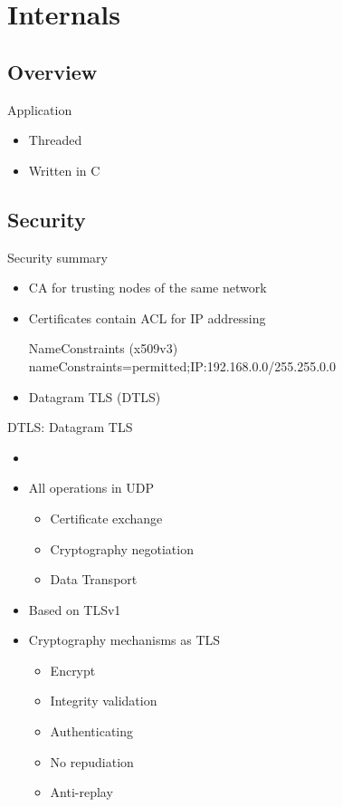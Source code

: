 \documentclass{beamer}
\begin{document}
\section{Internals}
\subsection{Overview}
\begin{frame}{Application}
	\begin{itemize}
	\item Threaded
	\item Written in C
	\end{itemize}
\end{frame}
\subsection{Security}
\begin{frame}{Security summary}
	\begin{itemize}
	\item CA for trusting nodes of the same network
	\item Certificates contain ACL for IP addressing
	\begin{block}{NameConstraints (x509v3)}
	nameConstraints=permitted;IP:192.168.0.0/255.255.0.0
	\end{block}
	\item Datagram TLS (DTLS)
	\end{itemize}
\end{frame}
\begin{frame}{DTLS: Datagram TLS}
	\begin{itemize}
	\item\begin{thebibliography}\beamertemplatearticlebibitems
	\item RFC 4347
	\end{thebibliography}
	\item All operations in UDP
		\begin{itemize}
		\item Certificate exchange
		\item Cryptography negotiation
		\item Data Transport
		\end{itemize}
	\item Based on TLSv1
	\item Cryptography mechanisms as TLS 
		\begin{itemize}
		\item Encrypt
		\item Integrity validation
		\item Authenticating
		\item No repudiation
		\item Anti-replay
		\end{itemize}
	\end{itemize}
\end{frame}
\end{document}
